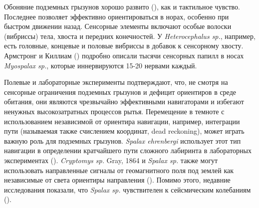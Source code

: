
Обоняние подземных грызунов хорошо развито (\cite{REICHMAN1990}), как и тактильное чувство. Последнее позволяет эффективно ориентироваться в норах, особенно при быстром движении назад. Сенсорные элементы включают особые волоски (вибриссы) тела, хвоста и передних конечностей. У \textit{Heterocephalus sp.}, например, есть головные, концевые и половые вибриссы в добавок к сенсорному хвосту. Армстронг и Киллиам (\cite{ARMSTRONG1961}) подробно описали тысячи сенсорных папилл в носах \textit{Myospalax sp.}, которые иннервируются 15-20 нервами каждый. 

Полевые и лабораторные эксперименты подтверждают, что, не смотря на сенсорные ограничения подземных грызунов и дефицит ориентиров в среде обитания, они являются чрезвычайно эффективными навигаторами и избегают ненужных высокозатратных процессов рытья. Перемещение в темноте с использованием независимой от ориентира навигации, например, интеграции пути (называемая также счислением координат, dead reckoning), может играть важную роль для подземных грызунов. \textit{Spalax ehrenbergi} использует этот тип навигации в определении кратчайшего пути сложного лабиринта в лабораторных экспериментах (\cite{Kimchi2004}). \textit{Cryptomys sp.} Gray, 1864 и \textit{Spalax sp.} также могут использовать направленные сигналы от геомагнитного поля под землей как независимые от света ориентиры направления (\cite{Kimchi2004}). Помимо этого, недавние исследования показали, что \textit{Spalax sp.} чувствителен к сейсмическим колебаниям (\cite{Heth1987}).



